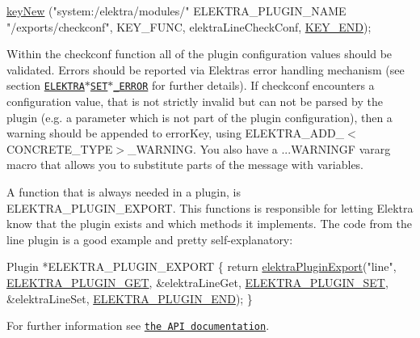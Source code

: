 \begin{DoxyCode}
\hyperlink{group__key_gad23c65b44bf48d773759e1f9a4d43b89}{keyNew} (\textcolor{stringliteral}{"system:/elektra/modules/"} ELEKTRA\_PLUGIN\_NAME \textcolor{stringliteral}{"/exports/checkconf"}, KEY\_FUNC, 
      elektraLineCheckConf, \hyperlink{group__key_gga9b703ca49f48b482def322b77d3e6bc8aa8adb6fcb92dec58fb19410eacfdd403}{KEY\_END});
\end{DoxyCode}


Within the {\ttfamily checkconf} function all of the plugin configuration values should be validated. Errors should be reported via Elektra\textquotesingle{}s error handling mechanism (see section \href{#elektra_set_concrete_error}{\tt E\+L\+E\+K\+T\+R\+A$\ast$\+S\+E\+T$\ast$\+\_\+\+E\+R\+R\+OR} for further details). If {\ttfamily checkconf} encounters a configuration value, that is not strictly invalid but can not be parsed by the plugin (e.\+g. a parameter which is not part of the plugin configuration), then a warning should be appended to {\ttfamily error\+Key}, using {\ttfamily E\+L\+E\+K\+T\+R\+A\+\_\+\+A\+D\+D\+\_\+$<$C\+O\+N\+C\+R\+E\+T\+E\+\_\+\+T\+Y\+PE$>$\+\_\+\+W\+A\+R\+N\+I\+NG}. You also have a {\ttfamily ...W\+A\+R\+N\+I\+N\+GF} vararg macro that allows you to substitute parts of the message with variables.

A function that is always needed in a plugin, is {\ttfamily E\+L\+E\+K\+T\+R\+A\+\_\+\+P\+L\+U\+G\+I\+N\+\_\+\+E\+X\+P\+O\+RT}. This functions is responsible for letting Elektra know that the plugin exists and which methods it implements. The code from the line plugin is a good example and pretty self-\/explanatory\+:


\begin{DoxyCode}
Plugin *ELEKTRA\_PLUGIN\_EXPORT
\{
        \textcolor{keywordflow}{return} \hyperlink{group__plugin_ga8dd092048e972a3f0c9c9f54eb41576e}{elektraPluginExport}(\textcolor{stringliteral}{"line"},
        \hyperlink{kdbplugin_8h_afed89ef026fb0622918a5de020de7814a3d5f4a887e68878f1cc3a75985194204}{ELEKTRA\_PLUGIN\_GET}, &elektraLineGet,
        \hyperlink{kdbplugin_8h_afed89ef026fb0622918a5de020de7814a85c9545261cf0bcc932616e67ea3b70a}{ELEKTRA\_PLUGIN\_SET}, &elektraLineSet,
        \hyperlink{kdbplugin_8h_afed89ef026fb0622918a5de020de7814a64a0bc789482284d9fd27ce974e0959a}{ELEKTRA\_PLUGIN\_END});
\}
\end{DoxyCode}


For further information see \href{https://doc.libelektra.org/api/latest/html/group__plugin.html}{\tt the A\+PI documentation}.


